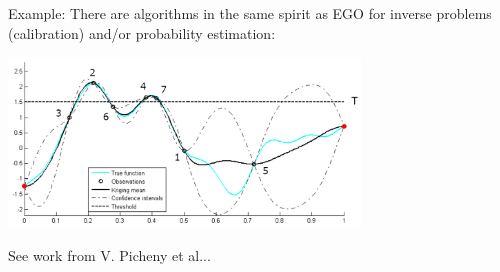 \documentclass{beamer}
\begin{document}
\begin{frame}{}
\begin{exampleblock}{Example: }
There are algorithms in the same spirit as EGO for inverse problems (calibration) and/or probability estimation:
\begin{center}
    \includegraphics[width=0.7\textwidth]{fig/illustOptIMSET}
\end{center}
See work from V. Picheny et al...
\end{exampleblock}
\end{frame}



\end{document}
